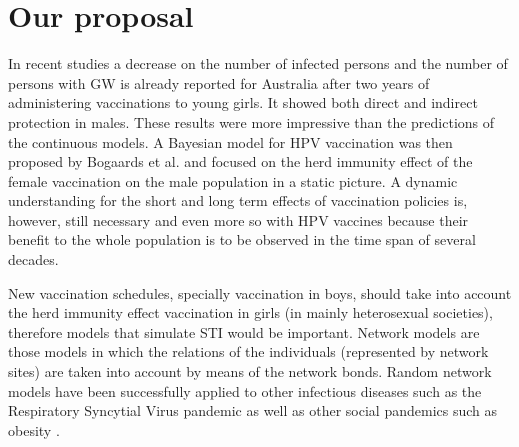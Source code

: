 
\section{Our proposal}



In recent studies \cite{fairley2009rapid,ali2013genital} a decrease on the number of infected persons and the number of persons with GW is already reported for Australia after two years of administering vaccinations to young girls. It showed both direct and indirect protection in males. These results were more impressive than the predictions of the continuous models. A Bayesian model for HPV vaccination was then proposed by Bogaards et al. \cite{bogaards2015direct} and focused on the herd immunity effect of the female vaccination on the male population in a static picture. A dynamic understanding for the short and long term effects of vaccination policies is, however, still necessary and even more so with HPV vaccines because their benefit to the whole population is to be observed in the time span of several decades.

New vaccination schedules, specially vaccination in boys, should take into account the herd immunity effect vaccination in girls (in mainly heterosexual societies), therefore models that simulate STI would be important. Network models are those models in which the relations of the individuals (represented by network sites) are taken into account by means of the network bonds. Random network models have been successfully applied to other infectious diseases such as the Respiratory Syncytial Virus pandemic \cite{acedo2011using} as well as other social pandemics such as obesity \cite{christakis2007spread}.

